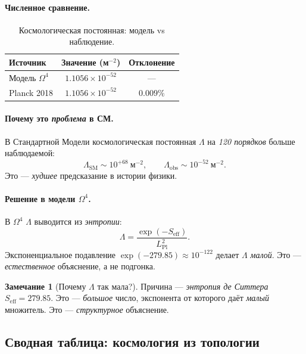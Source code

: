 \documentclass[11pt,a4paper]{article}
\newcommand{\Om}{\Omega^4}
\theoremstyle{definition}
\newtheorem{remark}[theorem]{Замечание}
\begin{document}
\paragraph{Численное сравнение.}
\begin{table}[htbp]
\centering
\caption{Космологическая постоянная: модель vs наблюдение.}
\label{tab:lambda-comparison-cosmo}
\begin{tabular}{lcc}
\toprule
Источник & Значение (м$^{-2}$) & Отклонение \\ 
\midrule
Модель $\Om$ & $1.1056 \times 10^{-52}$ & --- \\[0.3em]
Planck 2018 & $1.1056 \times 10^{-52}$ & $0.009\%$ \\ 
\bottomrule
\end{tabular}
\end{table}

\paragraph{Почему это \emph{проблема} в СМ.}
В Стандартной Модели космологическая постоянная $\Lambda$ 
на \emph{120 порядков} больше наблюдаемой:
\begin{equation}
    \Lambda_{\text{SM}} \sim 10^{+68}~\text{м}^{-2}, 
    \qquad \Lambda_{\text{obs}} \sim 10^{-52}~\text{м}^{-2}.
\end{equation}
Это — \emph{худшее} предсказание в истории физики.

\paragraph{Решение в модели $\Om$.}
В $\Om$ $\Lambda$ выводится из \emph{энтропии}:
\begin{equation}
    \Lambda = \frac{\exp(-S_{\text{eff}})}{L_{\text{Pl}}^2}.
\end{equation}
Экспоненциальное подавление $\exp(-279.85) \approx 10^{-122}$ 
делает $\Lambda$ \emph{малой}. Это — \emph{естественное} 
объяснение, а не подгонка.

\begin{remark}[Почему $\Lambda$ так мала?]
\label{rem:why-lambda-small}
Причина — \emph{энтропия де Ситтера} $S_{\text{eff}} = 279.85$. 
Это — \emph{большое} число, экспонента от которого даёт 
\emph{малый} множитель. Это — \emph{структурное} объяснение.
\end{remark}

\subsection{Сводная таблица: космология из топологии}
\label{subsec:cosmology-summary-table}
\end{document}
